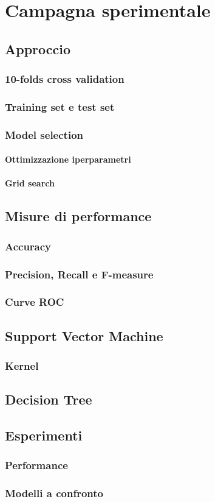\chapter{Campagna sperimentale}

\section{Approccio}
\subsection{10-folds cross validation}

\subsection{Training set e test set}

\subsection{Model selection}
\subsubsection{Ottimizzazione iperparametri}
\subsubsection{Grid search}

\section{Misure di performance}
\subsection{Accuracy}
\subsection{Precision, Recall e F-measure}
\subsection{Curve ROC}

\section{Support Vector Machine}
\subsection{Kernel}

\section{Decision Tree}

\section{Esperimenti}
\subsection{Performance}
\subsection{Modelli a confronto}
